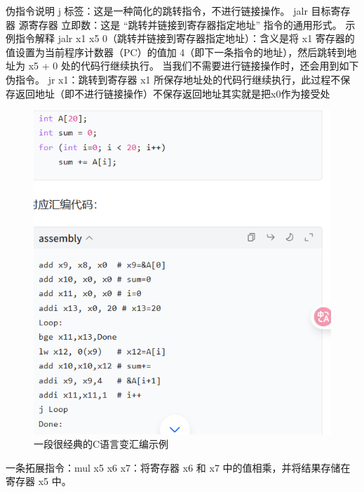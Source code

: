 \documentclass{ctexart}
\begin{document}
伪指令说明
j 标签：这是一种简化的跳转指令，不进行链接操作。
jalr 目标寄存器 源寄存器 立即数：这是 “跳转并链接到寄存器指定地址” 指令的通用形式。
示例指令解释
jalr x1 x5 0（跳转并链接到寄存器指定地址）：含义是将 x1 寄存器的值设置为当前程序计数器（PC）的值加 4（即下一条指令的地址），然后跳转到地址为 x5 + 0 处的代码行继续执行。
当我们不需要进行链接操作时，还会用到如下伪指令。
jr x1：跳转到寄存器 x1 所保存地址处的代码行继续执行，此过程不保存返回地址（即不进行链接操作）不保存返回地址其实就是把x0作为接受处
\begin{figure}
    \centering
    \includegraphics[width=0.5\linewidth]{1.png}
    \caption{一段很经典的C语言变汇编示例}
    \label{fig:enter-label}
\end{figure}
一条拓展指令：mul x5 x6 x7：将寄存器 x6 和 x7 中的值相乘，并将结果存储在寄存器 x5 中。
\end{document}

